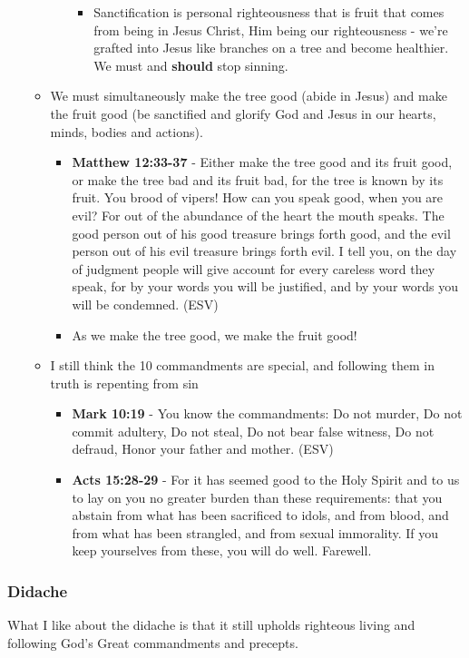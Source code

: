 \documentclass[11pt]{article}
\begin{document}
\begin{itemize}
\begin{itemize}
\begin{itemize}
\begin{itemize}
\item Sanctification is personal righteousness that is fruit that comes from being in Jesus Christ, Him being our righteousness - we're grafted into Jesus like branches on a tree and become healthier. We must and \textbf{should} stop sinning.
\end{itemize}
\end{itemize}
\item We must simultaneously make the tree good (abide in Jesus) and make the fruit good (be sanctified and glorify God and Jesus in our hearts, minds, bodies and actions).
\begin{itemize}
\item \textbf{Matthew 12:33-37} - Either make the tree good and its fruit good, or make the tree bad and its fruit bad, for the tree is known by its fruit. You brood of vipers! How can you speak good, when you are evil? For out of the abundance of the heart the mouth speaks. The good person out of his good treasure brings forth good, and the evil person out of his evil treasure brings forth evil. I tell you, on the day of judgment people will give account for every careless word they speak, for by your words you will be justified, and by your words you will be condemned. (ESV)
\item As we make the tree good, we make the fruit good!
\end{itemize}
\item I still think the 10 commandments are special, and following them in truth is repenting from sin
\begin{itemize}
\item \textbf{Mark 10:19} - You know the commandments: Do not murder, Do not commit adultery, Do not steal, Do not bear false witness, Do not defraud, Honor your father and mother. (ESV)
\item \textbf{Acts 15:28-29} - For it has seemed good to the Holy Spirit and to us to lay on you no greater burden than these requirements: that you abstain from what has been sacrificed to idols, and from blood, and from what has been strangled, and from sexual immorality. If you keep yourselves from these, you will do well. Farewell.
\end{itemize}
\end{itemize}
\end{itemize}

\subsubsection{Didache}
\label{sec:org99ca23d}
What I like about the didache is that it still upholds righteous living and following God's Great commandments and precepts.
\end{document}
